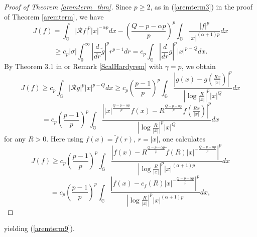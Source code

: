 \documentclass[a4paper,12pt,reqno]{amsart}
\renewcommand\eqref[1]{(\ref{#1})} %
\numberwithin{equation}{section}
\theoremstyle{plain}
\theoremstyle{definition}
\begin{document}
\begin{proof}[Proof of Theorem \ref{aremterm_thm}] Since $p\geq2$, as in  \eqref{aremterm3} in the proof of Theorem \ref{aremterm}, we have
$$J(f)=\int_{\mathbb{G}}|\mathcal{R}f|^{p}|x|^{-\alpha p}dx-\left(\frac{Q-p-\alpha p}{p}\right)^{p}\int_{\mathbb{G}}\frac{|f|^{p}}{|x|^{(\alpha+1)p}}dx$$
\begin{equation}\label{aremterm10}
\geq c_{p}|\sigma|\int_{0}^{\infty}\left|\frac{d}{dr}\widetilde{g}\right|^{p}r^{p-1}dr=
c_{p}\int_{\mathbb{G}}\left|\frac{d}{dr}g\right|^{p}|x|^{p-Q}dx.
\end{equation}
By Theorem 3.1 in \cite{Ruzhansky-Suragan:critical} or Remark \ref{ScalHardyrem} with $\gamma=p$, we obtain
$$J(f)\geq c_{p}\int_{\mathbb{G}}|\mathcal{R}g|^{p}|x|^{p-Q}dx\geq c_{p}\left(\frac{p-1}{p}\right)^{p}\int_{\mathbb{G}}\frac{\left|g(x)-g(\frac{Rx}{|x|})\right|^{p}}{\left|
\log\frac{R}{|x|}\right|^{p}|x|^{Q}}dx$$
$$=c_{p}\left(\frac{p-1}{p}\right)^{p}\int_{\mathbb{G}}\frac{\left||x|^{\frac{Q-p-\alpha p}{p}}f(x)-R^{\frac{Q-p-\alpha p}{p}}f(\frac{Rx}{|x|})\right|^{p}}{\left|
\log\frac{R}{|x|}\right|^{p}|x|^{Q}}dx$$
for any $R>0$.
Here using $f(x)=\widetilde{f}(r)$, $r=|x|$, one calculates
$$J(f)\geq c_{p}\left(\frac{p-1}{p}\right)^{p}\int_{\mathbb{G}}\frac{\left|f(x)-R^{\frac{Q-p-\alpha p}{p}}\widetilde{f}(R)|x|^{-\frac{Q-p-\alpha p}{p}}\right|^{p}}{\left|
\log\frac{R}{|x|}\right|^{p}|x|^{(\alpha+1)p}}dx$$
$$=c_{p}\left(\frac{p-1}{p}\right)^{p}\int_{\mathbb{G}}\frac{\left|f(x)-c_{f}(R)|x|^{-\frac{Q-p-\alpha p}{p}}\right|^{p}}{\left|
\log\frac{R}{|x|}\right|^{p}|x|^{(\alpha+1)p}}dx,$$
\end{proof}
yielding \eqref{aremterm9}.
\end{document}
